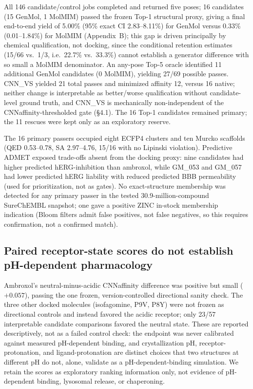 \documentclass{article}
\begin{document}
All 146 candidate/control jobs completed and returned five poses; 16 candidates (15 GenMol, 1 MolMIM) passed the frozen Top-1 structural proxy, giving a final end-to-end yield of 5.00\% (95\% exact CI 2.83--8.11\%) for GenMol versus 0.33\% (0.01--1.84\%) for MolMIM (Appendix~B); this gap is driven principally by chemical qualification, not docking, since the conditional retention estimates (15/66 vs.\ 1/3, i.e.\ 22.7\% vs.\ 33.3\%) cannot establish a generator difference with so small a MolMIM denominator. An any-pose Top-5 oracle identified 11 additional GenMol candidates (0 MolMIM), yielding 27/69 possible passes. CNN\_VS yielded 21 total passes and minimized affinity 12, versus 16 native; neither change is interpretable as better/worse qualification without candidate-level ground truth, and CNN\_VS is mechanically non-independent of the CNNaffinity-thresholded gate (\S4.1). The 16 Top-1 candidates remained primary; the 11 rescues were kept only as an exploratory reserve.

The 16 primary passers occupied eight ECFP4 clusters and ten Murcko scaffolds (QED 0.53--0.78, SA 2.97--4.76, 15/16 with no Lipinski violation). Predictive ADMET exposed trade-offs absent from the docking proxy: nine candidates had higher predicted hERG-inhibition than ambroxol, while GM\_053 and GM\_057 had lower predicted hERG liability with reduced predicted BBB permeability (used for prioritization, not as gates). No exact-structure membership was detected for any primary passer in the tested 30.9-million-compound SureChEMBL snapshot; one gave a positive ZINC in-stock membership indication (Bloom filters admit false positives, not false negatives, so this requires confirmation, not a confirmed match).

\subsection{Paired receptor-state scores do not establish pH-dependent pharmacology}

Ambroxol's neutral-minus-acidic CNNaffinity difference was positive but small ($+0.057$), passing the one frozen, version-controlled directional sanity check. The three other docked molecules (isofagomine, P9V, P8Y) were not frozen as directional controls and instead favored the acidic receptor; only 23/57 interpretable candidate comparisons favored the neutral state. These are reported descriptively, not as a failed control check: the endpoint was never calibrated against measured pH-dependent binding, and crystallization pH, receptor-protonation, and ligand-protonation are distinct choices that two structures at different pH do not, alone, validate as a pH-dependent-binding simulation. We retain the scores as exploratory ranking information only, not evidence of pH-dependent binding, lysosomal release, or chaperoning.
\end{document}
